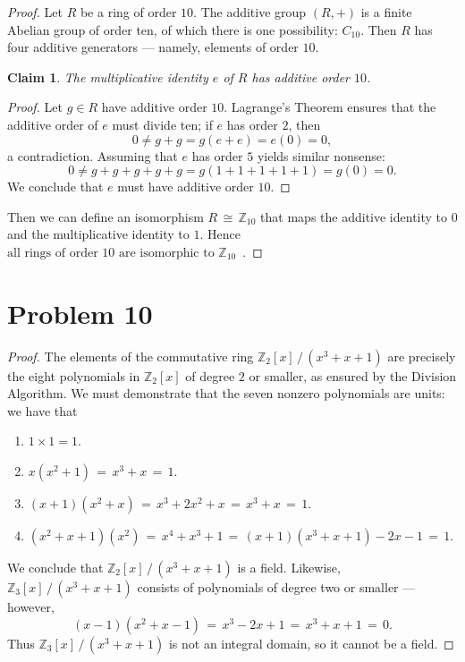 \documentclass[11pt]{article}
\newtheorem{claim}{Claim}
\begin{document}

\begin{proof}
  Let $R$ be a ring of order $10$. The additive group $(R, +)$ is a finite Abelian group of order ten, of which there is one possibility: $C_{10}$. Then $R$ has four additive generators ---  namely, elements of order $10$.

  \begin{claim}
    The multiplicative identity $e$ of $R$ has additive order $10$.
  \end{claim}
  \begin{adjustwidth}{1cm}{}
    \begin{proof}\renewcommand{\qedsymbol}{}
    Let $g \in R$ have additive order $10$. Lagrange's Theorem ensures that the additive order of $e$ must divide ten; if $e$ has order $2$, then
    \[
      0 \ne g + g = g(e + e) = e(0) = 0,
    \]
    a contradiction. Assuming that $e$ has order $5$ yields similar nonsense: 
    \[
      0 \ne g + g + g + g + g = g(1 + 1 + 1 + 1 + 1) = g(0) = 0.
    \]
    We conclude that $e$ must have additive order $10$.
    \end{proof}
  \end{adjustwidth}
  Then we can define an isomorphism $R \, \cong \, \mathbb{Z}_{10}$ that maps the additive identity to $0$ and the multiplicative identity to $1$. Hence $\boxed{\text{all rings of order $10$ are isomorphic to $\mathbb{Z}_{10}$}}$ \,.
\end{proof} 


\section{Problem 10}

\begin{proof}
  The elements of the commutative ring $\mathbb{Z}_{2} [x] \, / \, (x^{3} + x + 1)$ are precisely the eight polynomials in $\mathbb{Z}_{2}[x]$ of degree $2$ or smaller, as ensured by the Division Algorithm. We must demonstrate that the seven nonzero polynomials are units: we have that
  \begin{enumerate}
    \item $1 \times 1 = 1$.
    \item $x(x^{2} + 1) \, = \, x^{3} + x \, = \, 1$.
    \item $(x + 1)(x^{2} + x) \, = \, x^{3} + 2x^{2} + x \, = \, x^{3} + x \, = \, 1$.
    \item $(x^{2} + x + 1)(x^{2}) \, = \, x^{4} + x^{3} + 1 \, = \, (x + 1)(x^{3} + x + 1) - 2x - 1 \, = \, 1$.
  \end{enumerate}
  We conclude that $\mathbb{Z}_{2}[x] \, / \, (x^{3} + x + 1)$ is a field. Likewise, $\mathbb{Z}_{3}[x] \, / \, (x^{3} + x + 1)$ consists of polynomials of degree two or smaller --- however,
  \[
    (x - 1)(x^{2} + x - 1) \, = \, x^{3} - 2x + 1 \, = \, x^{3} + x + 1 \, = \, 0.
  \]
  Thus $\mathbb{Z}_{3}[x] \, / \, (x^{3} + x + 1)$ is not an integral domain, so it cannot be a field.
\end{proof}

\end{document}
